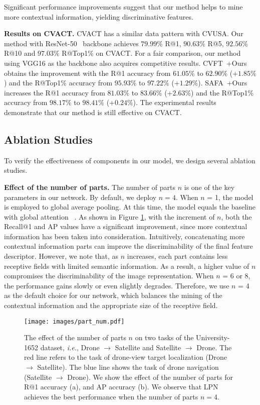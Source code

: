 \documentclass[journal]{IEEEtran}
\def\ie{\emph{i.e.}}
\begin{document}
Significant performance improvements suggest that our method helps to mine more contextual information, yielding discriminative features.
\par
\textbf{Results on CVACT.} CVACT has a similar data pattern with CVUSA. Our method with ResNet-50~\cite{he2016deep} backbone achieves $79.99\%$ R@1, $90.63\%$ R@5, $92.56\%$ R@10 and $97.03\%$ R@Top1\% on CVACT. For a fair comparison, our method using VGG16 as the backbone also acquires competitive results. CVFT~\cite{shi_optimal_nodate}+Ours obtains the improvement with the R@1 accuracy from $61.05\%$ to $62.90\%$ (+$1.85\%$) and the R@Top1\% accuracy from $95.93\%$ to $97.22\%$ (+$1.29\%$). SAFA~\cite{shi_spatial-aware_nodate}+Ours increases the R@1 accuracy from $81.03\%$ to $83.66\%$ (+$2.63\%$) and the R@Top1\% accuracy from $98.17\%$ to $98.41\%$ (+$0.24\%$). The experimental results demonstrate that our method is still effective on CVACT.

\subsection{Ablation Studies}\label{ablation}
To verify the effectiveness of components in our model, we design several ablation studies.
\par
\textbf{Effect of the number of parts.} 
The number of parts $n$ is one of the key parameters in our network. By default, we deploy $n=4$. 
When $n$ = 1, the model is employed to global average pooling. At this time, the model equals the baseline with global attention ~\cite{zheng_university-1652_nodate}.
As shown in Figure \ref{fig:parts}, with the increment of $n$, both the Recall@1 and AP values have a significant improvement, since more contextual information has been taken into consideration. Intuitively, concatenating more contextual information parts can improve the discriminability of the final feature descriptor. However, we note that, as $n$ increases, each part contains less receptive fields with limited semantic information. As a result, a higher value of $n$ compromises the discriminability of the image representation. When $n$ = 6 or 8, the performance gains slowly or even slightly degrades. Therefore, we use $n$ = 4 as the default choice for our network, which balances the mining of the contextual information and the appropriate size of the receptive field. 

\begin{figure}[htbp]
  \centering
  \texttt{[image: images/part\_num.pdf]}
  \caption{The effect of the number of parts $n$ on two tasks of the University-1652 dataset, \ie, Drone $\rightarrow$ Satellite and Satellite $\rightarrow$ Drone. The red line refers to the task of drone-view target localization (Drone $\rightarrow$ Satellite). The blue line shows the task of drone navigation (Satellite $\rightarrow$ Drone). We show the effect of the number of parts for R@1 accuracy (a), and AP accuracy (b). We observe that LPN achieves the best performance when the number of parts $n=$4.}
  \label{fig:parts}
\end{figure}
\end{document}
